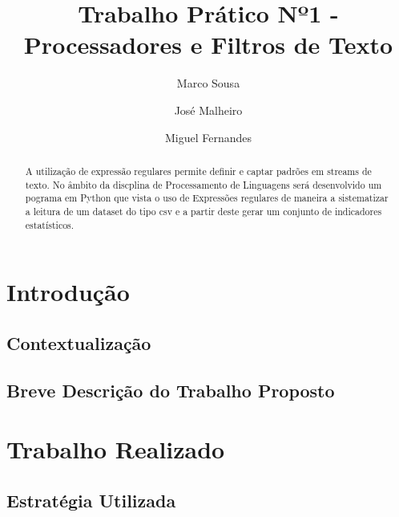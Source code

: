 \documentclass[runningheads]{llncs}
\begin{document}
%
\title{Trabalho Prático Nº1 - Processadores e Filtros de Texto}
%
%
\author{Marco Sousa \and
José Malheiro \and
Miguel Fernandes}
%
%
\maketitle              %
%
\begin{abstract}
A utilização de expressão regulares permite definir e captar padrões em
streams de texto. No âmbito da discplina de Processamento de Linguagens
será desenvolvido um pograma em Python que vista o uso de Expressões regulares
de maneira a sistematizar a leitura de um dataset do tipo csv e a partir deste gerar um 
conjunto de indicadores estatísticos.

\end{abstract}
%
%
%
\section{Introdução}
\subsection{Contextualização} 



\subsection{Breve Descrição do Trabalho Proposto}



\section{Trabalho Realizado} 

\subsection{Estratégia Utilizada} \label{subsec:strat}


\end{document}
